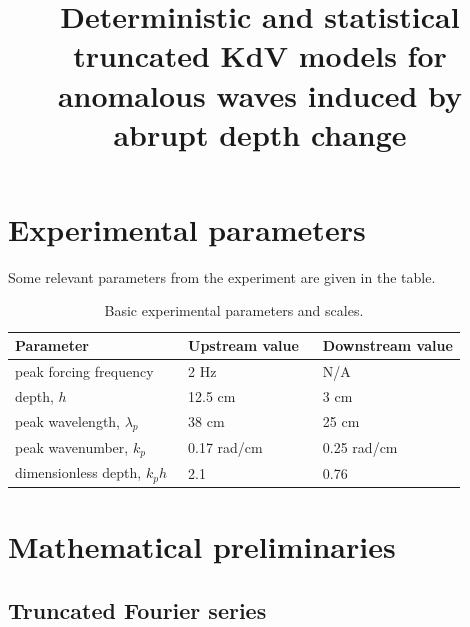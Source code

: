 \documentclass[12pt]{article}
\begin{document}
\title{Deterministic and statistical truncated KdV models for anomalous waves induced by abrupt depth change}
\author{}
\maketitle


\section{Experimental parameters}

Some relevant parameters from the experiment are given in the table.

\begin{table}%
\begin{center}
\caption{Basic experimental parameters and scales.}
\label{paramtable}
\begin{tabular}{l l l}
\hline Parameter & Upstream  value \,\, & Downstream value \\
\hline
peak forcing frequency			& 2 Hz			& N/A \\
depth, $h$						& 12.5 cm			& 3 cm \\
peak wavelength, $\lambda_p$		& 38 cm			& 25 cm \\
peak wavenumber, $k_p$			& 0.17 rad/cm		& 0.25 rad/cm \\
dimensionless depth, $k_p h$\,\,\,		& 2.1			& 0.76 \\
\end{tabular}
\end{center}
\end{table}
 
\section{Mathematical preliminaries}

\subsection{Truncated Fourier series}
\end{document}
